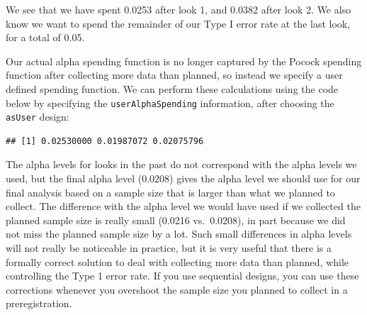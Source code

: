 \documentclass[
  oneside]{krantz}
\makeatletter
\newenvironment{Shaded}{\begin{snugshade}}{\end{snugshade}}
\newcommand{\AttributeTok}[1]{\textcolor[rgb]{0.61,0.61,0.61}{#1}}
\newcommand{\DecValTok}[1]{\textcolor[rgb]{0.06,0.06,0.06}{#1}}
\newcommand{\FloatTok}[1]{\textcolor[rgb]{0.06,0.06,0.06}{#1}}
\newcommand{\FunctionTok}[1]{\textcolor[rgb]{0,0,0}{#1}}
\newcommand{\NormalTok}[1]{#1}
\newcommand{\OtherTok}[1]{\textcolor[rgb]{0.37,0.37,0.37}{#1}}
\newcommand{\SpecialCharTok}[1]{\textcolor[rgb]{0,0,0}{#1}}
\newcommand{\StringTok}[1]{\textcolor[rgb]{0.5,0.5,0.5}{#1}}
\newenvironment{kframe}{%
\medskip{}
\setlength{\fboxsep}{.8em}
 \def\at@end@of@kframe{}%
 \ifinner\ifhmode%
  \def\at@end@of@kframe{\end{minipage}}%
  \begin{minipage}{\columnwidth}%
 \fi\fi%
 \def\FrameCommand##1{\hskip\@totalleftmargin \hskip-\fboxsep
 \colorbox{shadecolor}{##1}\hskip-\fboxsep
     \hskip-\linewidth \hskip-\@totalleftmargin \hskip\columnwidth}%
 \MakeFramed {\advance\hsize-\width
   \@totalleftmargin\z@ \linewidth\hsize
   \@setminipage}}%
 {\par\unskip\endMakeFramed%
 \at@end@of@kframe}
\renewenvironment{Shaded}{\begin{kframe}}{\end{kframe}}
\makeatother
\begin{document}
We see that we have spent 0.0253 after look 1, and 0.0382 after look 2. We also know we want to spend the remainder of our Type I error rate at the last look, for a total of 0.05.

Our actual alpha spending function is no longer captured by the Pocock spending function after collecting more data than planned, so instead we specify a user defined spending function. We can perform these calculations using the code below by specifying the \texttt{userAlphaSpending} information, after choosing the \texttt{asUser} design:

\begin{Shaded}
\end{Shaded}

\begin{verbatim}
## [1] 0.02530000 0.01987072 0.02075796
\end{verbatim}

The alpha levels for looks in the past do not correspond with the alpha levels we used, but the final alpha level (0.0208) gives the alpha level we should use for our final analysis based on a sample size that is larger than what we planned to collect. The difference with the alpha level we would have used if we collected the planned sample size is really small (0.0216 vs.~0.0208), in part because we did not miss the planned sample size by a lot. Such small differences in alpha levels will not really be noticeable in practice, but it is very useful that there is a formally correct solution to deal with collecting more data than planned, while controlling the Type 1 error rate. If you use sequential designs, you can use these corrections whenever you overshoot the sample size you planned to collect in a preregistration.
\end{document}
